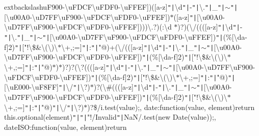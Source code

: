 extbackslash{}u\+F900-\/\textbackslash{}u\+F\+D\+C\+F\textbackslash{}u\+F\+D\+F0-\/\textbackslash{}u\+F\+F\+EF])([a-\/z]\texttt{"|}\textbackslash{}d\texttt{"|}-\/\texttt{"|}\textbackslash{}.\texttt{"|}\+\_\+\texttt{"|}$\sim$\texttt{"|}[\textbackslash{}u00\+A0-\/\textbackslash{}u\+D7\+F\+F\textbackslash{}u\+F900-\/\textbackslash{}u\+F\+D\+C\+F\textbackslash{}u\+F\+D\+F0-\/\textbackslash{}u\+F\+F\+EF])$\ast$([a-\/z]\texttt{"|}[\textbackslash{}u00\+A0-\/\textbackslash{}u\+D7\+F\+F\textbackslash{}u\+F900-\/\textbackslash{}u\+F\+D\+C\+F\textbackslash{}u\+F\+D\+F0-\/\textbackslash{}u\+F\+F\+EF])))\textbackslash{}.?)(\+:\textbackslash{}d $\ast$)?)(\textbackslash{}/((([a-\/z]\texttt{"|}\textbackslash{}d\texttt{"|}-\/\texttt{"|}\textbackslash{}.\texttt{"|}\+\_\+\texttt{"|}$\sim$\texttt{"|}[\textbackslash{}u00\+A0-\/\textbackslash{}u\+D7\+F\+F\textbackslash{}u\+F900-\/\textbackslash{}u\+F\+D\+C\+F\textbackslash{}u\+F\+D\+F0-\/\textbackslash{}u\+F\+F\+EF])\texttt{"|}(\%[\textbackslash{}da-\/f]\lcurly{}2\rcurly{})\texttt{"|}["!\textbackslash{}\$\&\textquotesingle{}\textbackslash{}(\textbackslash{})\textbackslash{}$\ast$\textbackslash{}+,;=]\texttt{"|}\+:\texttt{"|}"@)+(\textbackslash{}/(([a-\/z]\texttt{"|}\textbackslash{}d\texttt{"|}-\/\texttt{"|}\textbackslash{}.\texttt{"|}\+\_\+\texttt{"|}$\sim$\texttt{"|}[\textbackslash{}u00\+A0-\/\textbackslash{}u\+D7\+F\+F\textbackslash{}u\+F900-\/\textbackslash{}u\+F\+D\+C\+F\textbackslash{}u\+F\+D\+F0-\/\textbackslash{}u\+F\+F\+EF])\texttt{"|}(\%[\textbackslash{}da-\/f]\lcurly{}2\rcurly{})\texttt{"|}["!\textbackslash{}\$\&\textquotesingle{}\textbackslash{}(\textbackslash{})\textbackslash{}$\ast$\textbackslash{}+,;=]\texttt{"|}\+:\texttt{"|}"@)$\ast$)$\ast$)?)?(\textbackslash{}?((([a-\/z]\texttt{"|}\textbackslash{}d\texttt{"|}-\/\texttt{"|}\textbackslash{}.\texttt{"|}\+\_\+\texttt{"|}$\sim$\texttt{"|}[\textbackslash{}u00\+A0-\/\textbackslash{}u\+D7\+F\+F\textbackslash{}u\+F900-\/\textbackslash{}u\+F\+D\+C\+F\textbackslash{}u\+F\+D\+F0-\/\textbackslash{}u\+F\+F\+EF])\texttt{"|}(\%[\textbackslash{}da-\/f]\lcurly{}2\rcurly{})\texttt{"|}["!\textbackslash{}\$\&\textquotesingle{}\textbackslash{}(\textbackslash{})\textbackslash{}$\ast$\textbackslash{}+,;=]\texttt{"|}\+:\texttt{"|}"@)\texttt{"|}[\textbackslash{}u\+E000-\/\textbackslash{}u\+F8\+FF]\texttt{"|}\textbackslash{}/\texttt{"|}\textbackslash{}?)$\ast$)?(\textbackslash{}\#((([a-\/z]\texttt{"|}\textbackslash{}d\texttt{"|}-\/\texttt{"|}\textbackslash{}.\texttt{"|}\+\_\+\texttt{"|}$\sim$\texttt{"|}[\textbackslash{}u00\+A0-\/\textbackslash{}u\+D7\+F\+F\textbackslash{}u\+F900-\/\textbackslash{}u\+F\+D\+C\+F\textbackslash{}u\+F\+D\+F0-\/\textbackslash{}u\+F\+F\+EF])\texttt{"|}(\%[\textbackslash{}da-\/f]\lcurly{}2\rcurly{})\texttt{"|}["!\textbackslash{}\$\&\textquotesingle{}\textbackslash{}(\textbackslash{})\textbackslash{}$\ast$\textbackslash{}+,;=]\texttt{"|}\+:\texttt{"|}"@)\texttt{"|}\textbackslash{}/\texttt{"|}\textbackslash{}?)$\ast$)?\$/i.\+test(value);\rcurly{}, date\+:function(value, element)\lcurly{}return this.\+optional(element)\texttt{"|}\texttt{"|}"!/\+Invalid\texttt{"|}Na\+N/.\+test(new Date(value));\rcurly{}, date\+I\+S\+O\+:function(value, element)\lcurly{}return 